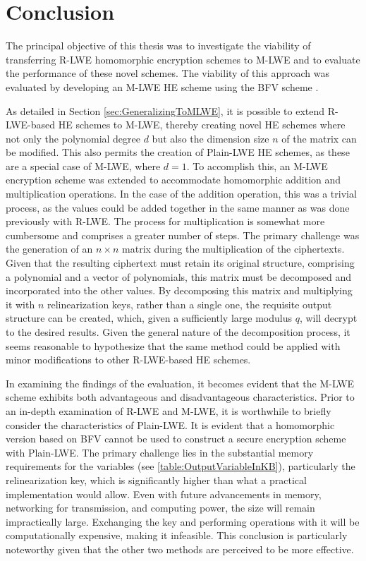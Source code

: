 \chapter{Conclusion}

The principal objective of this thesis was to investigate the viability of transferring R-LWE homomorphic encryption schemes to M-LWE and to evaluate the performance of these novel schemes. The viability of this approach was evaluated by developing an M-LWE HE scheme using the BFV scheme \cite{BFV}.
 
As detailed in Section \ref{sec:GeneralizingToMLWE}, it is possible to extend R-LWE-based HE schemes to M-LWE, thereby creating novel HE schemes where not only the polynomial degree $d$ but also the dimension size $n$ of the matrix can be modified. This also permits the creation of Plain-LWE HE schemes, as these are a special case of M-LWE, where $d=1$. To accomplish this, an M-LWE encryption scheme was extended to accommodate homomorphic  addition and multiplication operations. In the case of the addition operation, this was a trivial process, as the values could be added together in the same manner as was done previously with R-LWE. The process for multiplication is somewhat more cumbersome and comprises a greater number of steps. The primary challenge was the generation of an $n \times n$ matrix during the multiplication of the ciphertexts. Given that the resulting ciphertext must retain its original structure, comprising a polynomial and a vector of polynomials, this matrix must be decomposed and incorporated into the other values. By decomposing this matrix and multiplying it with $n$ relinearization keys, rather than a single one, the requisite output structure can be created, which, given a sufficiently large modulus $q$, will decrypt to the desired results. Given the general nature of the decomposition process, it seems reasonable to hypothesize that the same method could be applied with minor modifications to other R-LWE-based HE schemes.


In examining the findings of the evaluation, it becomes evident that the M-LWE scheme exhibits both advantageous and disadvantageous characteristics. Prior to an in-depth examination of R-LWE and M-LWE, it is worthwhile to briefly consider the characteristics of Plain-LWE. It is evident that a homomorphic version based on BFV cannot be used to construct a secure encryption scheme with Plain-LWE. The primary challenge lies in the substantial memory requirements for the variables (see \ref{table:OutputVariableInKB}), particularly the relinearization key, which is significantly higher than what a practical implementation would allow. Even with future advancements in memory, networking for transmission, and computing power, the size will remain impractically large. Exchanging the key and performing operations with it will be computationally expensive, making it infeasible. This conclusion is particularly noteworthy given that the other two methods are perceived to be more effective.

